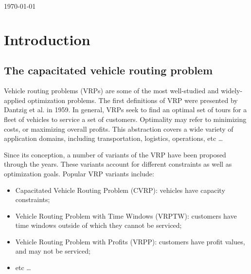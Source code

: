 \documentclass[12pt]{report}
\begin{document}
\begin{titlepage}


	\vfill\vfill\vfill %

	{\large\today} %

	\vfill %
\end{titlepage}

\tableofcontents
\pagebreak

\chapter{Introduction}
\section{The capacitated vehicle routing problem}
Vehicle routing problems (VRPs) are some of the most well-studied and widely-applied optimization problems. The first definitions of VRP were presented by Dantzig et al. \cite{dantzig1959truck} in 1959. In general, VRPs seek to find an optimal set of tours for a fleet of vehicles to service a set of customers. Optimality may refer to minimizing costs, or maximizing overall profits. This abstraction covers a wide variety of application domains, including transportation, logistics, operations, etc \dots

Since its conception, a number of variants of the VRP have been proposed through the years. These variants account for different constraints as well as optimization goals. Popular VRP variants include:
\begin{itemize}
	\item Capacitated Vehicle Routing Problem (CVRP): vehicles have capacity constraints;
	\item Vehicle Routing Problem with Time Windows (VRPTW): customers have time windows outside of which they cannot be serviced;
	\item Vehicle Routing Problem with Profits (VRPP): customers have profit values, and may not be serviced;
	\item etc \dots
\end{itemize}
\end{document}
